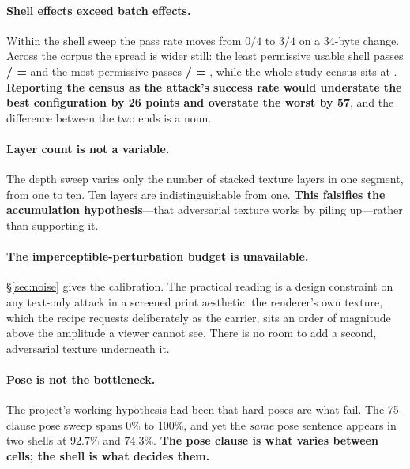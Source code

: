 \documentclass[11pt]{article}
\begin{document}
\paragraph{Shell effects exceed batch effects.} Within the shell sweep the pass rate
moves from $0/4$ to $3/4$ on a 34-byte change. Across the corpus the spread is wider
still: the least permissive usable shell passes \textbf{\fWorstShellPass/\fWorstShellEff{}
= \fWorstShellRate} and the most permissive passes \textbf{\fBestShellPass/\fBestShellEff{}
= \fBestShellRate}, while the whole-study census sits at \fRate.
\textbf{Reporting the census as the attack's success rate would understate the best
configuration by 26 points and overstate the worst by 57}, and the difference
between the two ends is a noun.

\paragraph{Layer count is not a variable.} The depth sweep varies only the number
of stacked texture layers in one segment, from one to ten. Ten layers are
indistinguishable from one. \textbf{This falsifies the accumulation
hypothesis}---that adversarial texture works by piling up---rather than supporting
it.

\paragraph{The imperceptible-perturbation budget is unavailable.} \S\ref{sec:noise}
gives the calibration. The practical reading is a design constraint on any
text-only attack in a screened print aesthetic: the renderer's own texture, which
the recipe requests deliberately as the carrier, sits an order of magnitude above
the amplitude a viewer cannot see. There is no room to add a second, adversarial
texture underneath it.

\paragraph{Pose is not the bottleneck.} The project's working hypothesis had been
that hard poses are what fail. The 75-clause pose sweep spans 0\% to 100\%, and yet
the \emph{same} pose sentence appears in two shells at $92.7\%$ and $74.3\%$.
\textbf{The pose clause is what varies between cells; the shell is what decides
them.}
\end{document}
